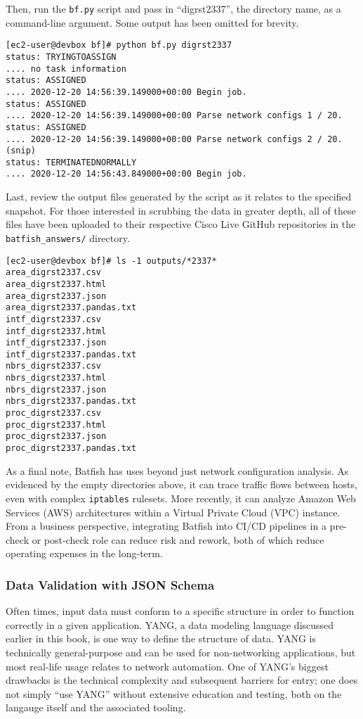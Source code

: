 Then, run the \verb|bf.py| script and pass in ``digrst2337'', the directory
name, as a command-line argument. Some output has been omitted for brevity.

\begin{verbatim}
[ec2-user@devbox bf]# python bf.py digrst2337
status: TRYINGTOASSIGN
.... no task information
status: ASSIGNED
.... 2020-12-20 14:56:39.149000+00:00 Begin job.
status: ASSIGNED
.... 2020-12-20 14:56:39.149000+00:00 Parse network configs 1 / 20.
status: ASSIGNED
.... 2020-12-20 14:56:39.149000+00:00 Parse network configs 2 / 20.
(snip)
status: TERMINATEDNORMALLY
.... 2020-12-20 14:56:43.849000+00:00 Begin job.
\end{verbatim}

Last, review the output files generated by the script as it relates to
the specified snapshot. For those interested in scrubbing the data in
greater depth, all of these files have been uploaded to their respective
Cisco Live GitHub repositories in the \verb|batfish_answers/| directory.

\begin{verbatim}
[ec2-user@devbox bf]# ls -1 outputs/*2337*
area_digrst2337.csv
area_digrst2337.html
area_digrst2337.json
area_digrst2337.pandas.txt
intf_digrst2337.csv
intf_digrst2337.html
intf_digrst2337.json
intf_digrst2337.pandas.txt
nbrs_digrst2337.csv
nbrs_digrst2337.html
nbrs_digrst2337.json
nbrs_digrst2337.pandas.txt
proc_digrst2337.csv
proc_digrst2337.html
proc_digrst2337.json
proc_digrst2337.pandas.txt
\end{verbatim}

As a final note, Batfish has uses beyond just network configuration analysis.
As evidenced by the empty directories above, it can trace traffic flows between
hosts, even with complex \verb|iptables| rulesets. More recently, it can
analyze Amazon Web Services (AWS) architectures within a Virtual Private
Cloud (VPC) instance. From a business perspective, integrating Batfish into
CI/CD pipelines in a pre-check or post-check role can reduce risk and rework,
both of which reduce operating expenses in the long-term.

\subsubsection{Data Validation with JSON Schema}
Often times, input data must conform to a specific structure in order to
function correctly in a given application. YANG, a data modeling language
discussed earlier in this book, is one way to define the structure of data.
YANG is technically general-purpose and can be used for non-networking
applications, but most real-life usage relates to network automation. One
of YANG's biggest drawbacks is the technical complexity and subsequent
barriers for entry; one does not simply ``use YANG'' without extensive
education and testing, both on the langauge itself and the associated tooling.

